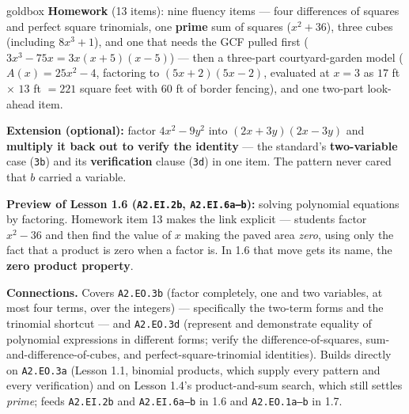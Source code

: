 \documentclass[10pt]{article}
\begin{document}
\boxguard[18]
\begin{skillbox}{goldbox}
\textbf{Homework} (13 items): nine fluency items --- four differences of squares and perfect square
trinomials, one \textbf{prime} sum of squares ($x^2+36$), three cubes (including $8x^3+1$), and one
that needs the GCF pulled first ($3x^3-75x = 3x(x+5)(x-5)$) --- then a three-part courtyard-garden
model ($A(x)=25x^2-4$, factoring to $(5x+2)(5x-2)$, evaluated at $x=3$ as $17$ ft $\times$ $13$ ft
$=221$ square feet with $60$ ft of border fencing), and one two-part look-ahead item.

\textbf{Extension (optional):} factor $4x^2-9y^2$ into $(2x+3y)(2x-3y)$ and \textbf{multiply it back
out to verify the identity} --- the standard's \textbf{two-variable} case (\texttt{3b}) and its
\textbf{verification} clause (\texttt{3d}) in one item. The pattern never cared that $b$ carried a
variable.

\textbf{Preview of Lesson 1.6 (\texttt{A2.EI.2b}, \texttt{A2.EI.6a--b}):} solving polynomial
equations by factoring. Homework item 13 makes the link explicit --- students factor $x^2-36$ and
then find the value of $x$ making the paved area \emph{zero}, using only the fact that a product is
zero when a factor is. In 1.6 that move gets its name, the \textbf{zero product property}.

\textbf{Connections.} Covers \texttt{A2.EO.3b} (factor completely, one and two variables, at most
four terms, over the integers) --- specifically the two-term forms and the trinomial shortcut ---
and \texttt{A2.EO.3d} (represent and demonstrate equality of polynomial expressions in different
forms; verify the difference-of-squares, sum-and-difference-of-cubes, and perfect-square-trinomial
identities). Builds directly on \texttt{A2.EO.3a} (Lesson 1.1, binomial products, which supply every
pattern and every verification) and on Lesson 1.4's product-and-sum search, which still settles
\emph{prime}; feeds \texttt{A2.EI.2b} and \texttt{A2.EI.6a--b} in 1.6 and \texttt{A2.EO.1a--b} in
1.7.
\end{skillbox}
\end{document}
